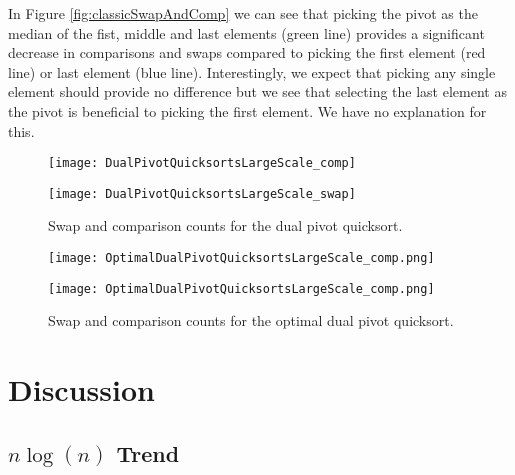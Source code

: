	In Figure \ref{fig:classicSwapAndComp} we can see that picking the pivot as the median of the fist, middle and last elements (green line) provides a significant decrease in comparisons and swaps compared to picking the first element (red line) or last element (blue line). Interestingly, we expect that picking any single element should provide no difference but we see that selecting the last element as the pivot is beneficial to picking the first element. We have no explanation for this.

	\begin{figure}
		\centering
		\begin{minipage}{.5\textwidth}
		 	\centering
		 	\texttt{[image: DualPivotQuicksortsLargeScale\_comp]}
		\end{minipage}%
		\begin{minipage}{.5\textwidth}
		 	\centering
		 	\texttt{[image: DualPivotQuicksortsLargeScale\_swap]}
		\end{minipage}
		\caption{Swap and comparison counts for the dual pivot quicksort.}
		\label{fig:dualSwapAndComp}
	\end{figure}

	\begin{figure}
		\centering
		\begin{minipage}{.5\textwidth}
		 	\centering
		 	\texttt{[image: OptimalDualPivotQuicksortsLargeScale\_comp.png]}
		\end{minipage}%
		\begin{minipage}{.5\textwidth}
		 	\centering
		 	\texttt{[image: OptimalDualPivotQuicksortsLargeScale\_comp.png]}
		\end{minipage}
		\caption{Swap and comparison counts for the optimal dual pivot quicksort.}
		\label{fig:optimalDualSwapAndCount}
	\end{figure}



		

\section{Discussion}
	\label{sec:Discussion}
	\subsection{$n\log(n)$ Trend}
		
